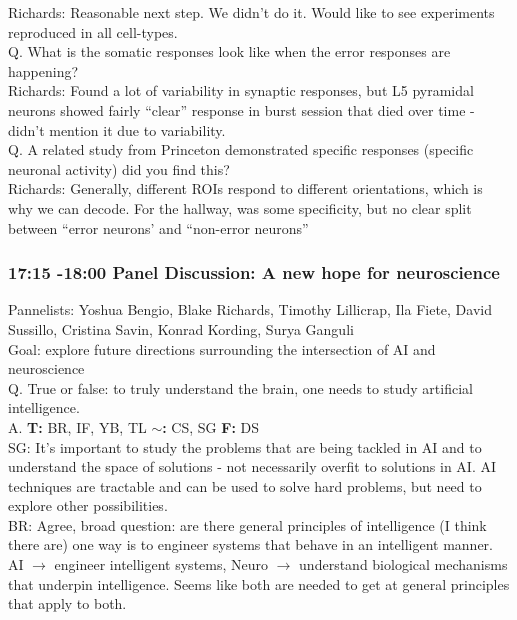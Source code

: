 \documentclass[12pt]{article}
\begin{document}
Richards: Reasonable next step. We didn't do it. Would like to see experiments reproduced in all cell-types. \\

Q. What is the somatic responses look like when the error responses are happening? \\

Richards: Found a lot of variability in synaptic responses, but L5 pyramidal neurons showed fairly ``clear'' response in burst session that died over time - didn't mention it due to variability. \\

Q. A related study from Princeton demonstrated specific responses (specific neuronal activity) did you find this? \\

Richards: Generally, different ROIs respond to different orientations, which is why we can decode. For the hallway, was some specificity, but no clear split between ``error neurons' and ``non-error neurons'' \\


\subsubsection{17:15 -18:00 Panel Discussion: A new hope for neuroscience}

Pannelists: Yoshua Bengio, Blake Richards, Timothy Lillicrap,  Ila Fiete, David Sussillo, Cristina Savin, Konrad Kording, Surya Ganguli \\

Goal: explore future directions surrounding the intersection of AI and neuroscience \\

Q. True or false: to truly understand the brain, one needs to study artificial intelligence.  \\

A. \textbf{T: } BR, IF, YB, TL $\mathbf{\sim}$\textbf{:} CS, SG \textbf{F: }DS \\

SG: It's important to study the problems that are being tackled in AI and to understand the space of solutions - not necessarily overfit to solutions in AI. AI techniques are tractable and can be used to solve hard problems, but need to explore other possibilities. \\

BR: Agree, broad question: are there general principles of intelligence (I think there are) one way is to engineer systems that behave in an intelligent manner. AI $\rightarrow$ engineer intelligent systems, Neuro $\rightarrow$ understand biological mechanisms that underpin intelligence. Seems like both are needed to get at general principles that apply to both. \\
\end{document}
